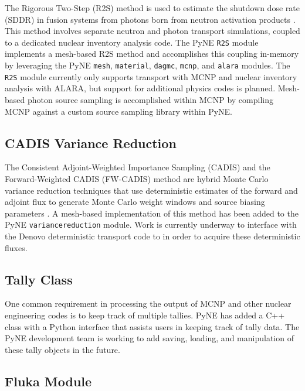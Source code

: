 \documentclass{anstrans}
\begin{document}
The Rigorous Two-Step (R2S) method is used to estimate the shutdown dose rate
(SDDR) in fusion systems from photons born from neutron activation products
\cite{chen_rigorous_2002}. This method involves separate neutron and photon
transport simulations, coupled to a dedicated nuclear inventory analysis code.
The PyNE \texttt{R2S} module implements a mesh-based R2S method and
accomplishes this coupling in-memory by leveraging the PyNE \texttt{mesh},
\texttt{material}, \texttt{dagmc}, \texttt{mcnp}, and \texttt{alara} modules.
The \texttt{R2S} module currently only supports transport with MCNP and nuclear
inventory analysis with ALARA, but support for additional physics codes is
planned. Mesh-based photon source sampling is accomplished within MCNP by
compiling MCNP against a custom source sampling library within PyNE.


\subsection{CADIS Variance Reduction}

The Consistent Adjoint-Weighted Importance Sampling (CADIS) and the
Forward-Weighted CADIS (FW-CADIS) method are hybrid Monte Carlo variance reduction
techniques that use deterministic estimates of the forward and adjoint flux to
generate Monte Carlo weight windows and source biasing parameters
\cite{haghighat_monte_2003}. A mesh-based implementation of this method has
been added to the PyNE \texttt{variancereduction} module. Work is currently
underway to interface with the Denovo \cite{Evans2010} deterministic transport
code to in order to acquire these deterministic fluxes.


\subsection{Tally Class}

One common requirement in processing the output of MCNP and other nuclear
engineering codes is to keep track of multiple tallies. PyNE has added a
C++ class with a Python interface that assists users in keeping track of
tally data. The PyNE development team is working to add saving, loading,
and manipulation of these tally objects in the future.

\subsection{Fluka Module}
\end{document}
